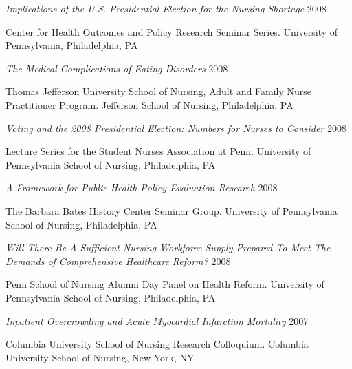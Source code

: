 \documentclass[10pt,]{article}
\begin{document}
{{{{{{{{{{{{{{{\begin{hangparas}{.5in}{1}
{\textit {Implications of the U.S. Presidential Election for the Nursing Shortage}} \hfill 2008 
\vspace{-2.5mm}
\begin{adjustwidth}{0.5cm}{1cm}
Center for Health Outcomes and Policy Research Seminar Series. University of Pennsylvania, Philadelphia, PA
\end{adjustwidth}

{\textit {The Medical Complications of Eating Disorders}} \hfill 2008 
\vspace{-2.5mm}
\begin{adjustwidth}{0.5cm}{1cm}
Thomas Jefferson University School of Nursing, Adult and Family Nurse Practitioner Program. Jefferson School of Nursing, Philadelphia, PA
\end{adjustwidth}

{\textit {Voting and the 2008 Presidential Election: Numbers for Nurses to Consider}} \hfill 2008 
\vspace{-2.5mm}
\begin{adjustwidth}{0.5cm}{1cm}
Lecture Series for the Student Nurses Association at Penn. University of Pennsylvania School of Nursing, Philadelphia, PA
\end{adjustwidth}

{\textit {A Framework for Public Health Policy Evaluation Research}} \hfill 2008 
\vspace{-2.5mm}
\begin{adjustwidth}{0.5cm}{1cm}
The Barbara Bates History Center Seminar Group. University of Pennsylvania School of Nursing, Philadelphia, PA
\end{adjustwidth}

{\textit {Will There Be A Sufficient Nursing Workforce Supply Prepared To Meet The Demands of Comprehensive Healthcare Reform?}} \hfill 2008 
\vspace{-2.5mm}
\begin{adjustwidth}{0.5cm}{1cm}
Penn School of Nursing Alumni Day Panel on Health Reform. University of Pennsylvania School of Nursing, Philadelphia, PA
\end{adjustwidth}

{\textit {Inpatient Overcrowding and Acute Myocardial Infarction Mortality}} \hfill 2007 
\vspace{-2.5mm}
\begin{adjustwidth}{0.5cm}{1cm}
Columbia University School of Nursing Research Colloquium. Columbia University School of Nursing, New York, NY
\end{adjustwidth}


\end{hangparas}}}}}}}}}}}}}}}}
\end{document}
